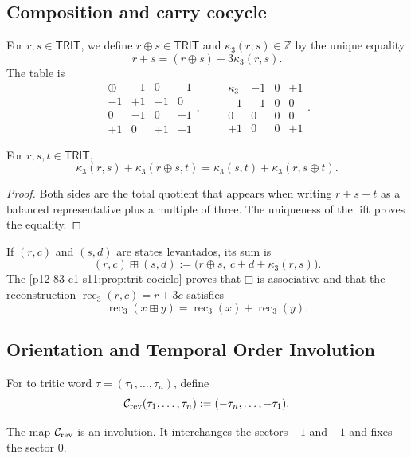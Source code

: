 \subsection{Composition and carry cocycle}

For \(r,s\in\mathsf{TRIT}\), we define \(r\oplus s\in\mathsf{TRIT}\) and
\(\kappa_3(r,s)\in\mathbb Z\) by the unique equality
\[
 r+s=(r\oplus s)+3\kappa_3(r,s).
\]
The table is
\[
\begin{array}{c|ccc}
\oplus&-1&0&+1\\\hline
-1&+1&-1&0\\
0&-1&0&+1\\
+1&0&+1&-1
\end{array},
\qquad
\begin{array}{c|ccc}
\kappa_3&-1&0&+1\\\hline
-1&-1&0&0\\
0&0&0&0\\
+1&0&0&+1
\end{array}.
\]

\begin{proposition}
\label{p12-83-c1-s11:prop:trit-cociclo}
For \(r,s,t\in\mathsf{TRIT}\),
\[
 \kappa_3(r,s)+\kappa_3(r\oplus s,t)
 =\kappa_3(s,t)+\kappa_3(r,s\oplus t).
\]
\end{proposition}

\begin{proof}
Both sides are the total quotient that appears when writing
\(r+s+t\) as a balanced representative plus a multiple of three. The
uniqueness of the lift proves the equality.
\end{proof}

If \((r,c)\) and \((s,d)\) are states levantados, its sum is
\[
 (r,c)\boxplus(s,d)
 :=\bigl(r\oplus s,\ c+d+\kappa_3(r,s)\bigr).
\]
The \cref{p12-83-c1-s11:prop:trit-cociclo} proves that \(\boxplus\) is associative and that the
reconstruction \(\operatorname{rec}_3(r,c)=r+3c\) satisfies
\[
 \operatorname{rec}_3(x\boxplus y)
 =\operatorname{rec}_3(x)+\operatorname{rec}_3(y).
\]

\subsection{Orientation and Temporal Order Involution}

For to tritic word \(\tau=(\tau_1,\ldots,\tau_n)\), define
\[
 \mathcal C_{\rm rev}(\tau_1,\ldots,\tau_n)
 :=(-\tau_n,\ldots,-\tau_1).
\]

\begin{lemma}
\label{p12-83-c1-s11:lem:trit-reversion}
The map \(\mathcal C_{\rm rev}\) is an involution. It interchanges the
sectors \(+1\) and \(-1\) and fixes the sector \(0\).
\end{lemma}

